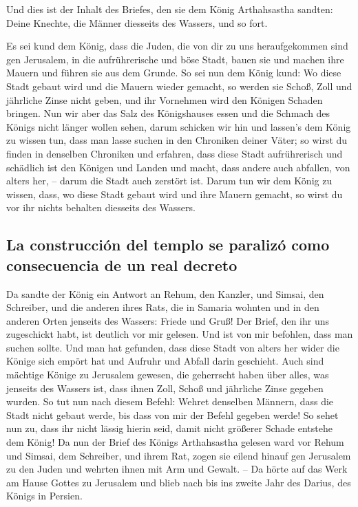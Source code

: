  Und dies ist der Inhalt des Briefes, den sie dem König
Arthahsastha sandten: Deine Knechte, die Männer diesseits des Wassers,
und so fort.

 Es sei kund dem König, dass die Juden, die von dir zu
uns heraufgekommen sind gen Jerusalem, in die aufrührerische und böse
Stadt, bauen sie und machen ihre Mauern und führen sie aus dem Grunde.
 So sei nun dem König kund: Wo diese Stadt gebaut wird
und die Mauern wieder gemacht, so werden sie Schoß, Zoll und jährliche
Zinse nicht geben, und ihr Vornehmen wird den Königen Schaden bringen.
 Nun wir aber das Salz des Königshauses essen und die
Schmach des Königs nicht länger wollen sehen, darum schicken wir hin und
lassen's dem König zu wissen tun,  dass man lasse suchen
in den Chroniken deiner Väter; so wirst du finden in denselben Chroniken
und erfahren, dass diese Stadt aufrührerisch und schädlich ist den
Königen und Landen und macht, dass andere auch abfallen, von alters her,
-- darum die Stadt auch zerstört ist.  Darum tun wir dem
König zu wissen, dass, wo diese Stadt gebaut wird und ihre Mauern
gemacht, so wirst du vor ihr nichts behalten diesseits des Wassers.

\hypertarget{la-construcciuxf3n-del-templo-se-paralizuxf3-como-consecuencia-de-un-real-decreto}{%
\subsection{La construcción del templo se paralizó como consecuencia de
un real
decreto}\label{la-construcciuxf3n-del-templo-se-paralizuxf3-como-consecuencia-de-un-real-decreto}}

 Da sandte der König ein Antwort an Rehum, den Kanzler,
und Simsai, den Schreiber, und die anderen ihres Rats, die in Samaria
wohnten und in den anderen Orten jenseits des Wassers: Friede und Gruß!
 Der Brief, den ihr uns zugeschickt habt, ist deutlich
vor mir gelesen.  Und ist von mir befohlen, dass man
suchen sollte. Und man hat gefunden, dass diese Stadt von alters her
wider die Könige sich empört hat und Aufruhr und Abfall darin geschieht.
 Auch sind mächtige Könige zu Jerusalem gewesen, die
geherrscht haben über alles, was jenseits des Wassers ist, dass ihnen
Zoll, Schoß und jährliche Zinse gegeben wurden.  So tut
nun nach diesem Befehl: Wehret denselben Männern, dass die Stadt nicht
gebaut werde, bis dass von mir der Befehl gegeben werde! 
So sehet nun zu, dass ihr nicht lässig hierin seid, damit nicht größerer
Schade entstehe dem König!  Da nun der Brief des Königs
Arthahsastha gelesen ward vor Rehum und Simsai, dem Schreiber, und ihrem
Rat, zogen sie eilend hinauf gen Jerusalem zu den Juden und wehrten
ihnen mit Arm und Gewalt. --  Da hörte auf das Werk am
Hause Gottes zu Jerusalem und blieb nach bis ins zweite Jahr des Darius,
des Königs in Persien.

